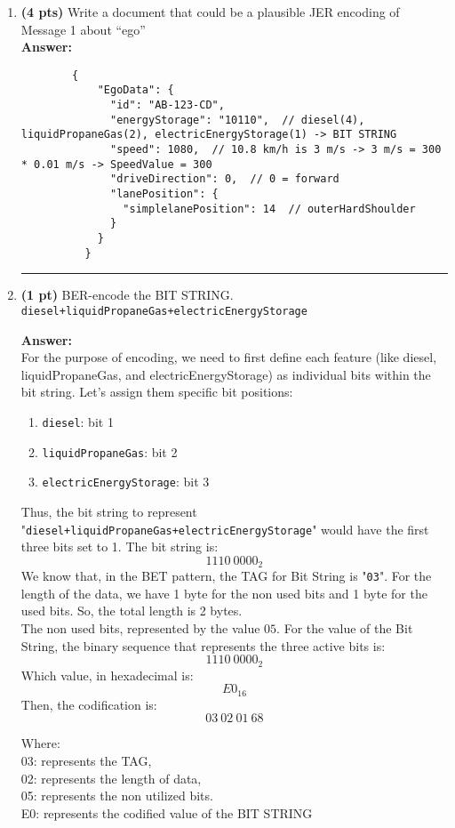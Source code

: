 \documentclass[a4paper,10pt]{article}
\begin{document}
\begin{enumerate}[label=\textbf{Question \arabic*.}]
    \break
    \item \textbf{(4 pts)} Write a document that could be a plausible JER encoding of Message 1 about “ego” \\
    
    \textbf{Answer:} 
    \begin{lstlisting}
        {
            "EgoData": {
              "id": "AB-123-CD",
              "energyStorage": "10110",  // diesel(4), liquidPropaneGas(2), electricEnergyStorage(1) -> BIT STRING
              "speed": 1080,  // 10.8 km/h is 3 m/s -> 3 m/s = 300 * 0.01 m/s -> SpeedValue = 300
              "driveDirection": 0,  // 0 = forward
              "lanePosition": {
                "simplelanePosition": 14  // outerHardShoulder
              }
            }
          }
        \end{lstlisting}
        \noindent\rule{\textwidth}{0.4mm}
    
    \item \textbf{(1 pt)} BER-encode the BIT STRING. \texttt{diesel+liquidPropaneGas+electricEnergyStorage}
    
    \textbf{Answer:} \\
    For the purpose of encoding, we need to first define each feature (like diesel, liquidPropaneGas, and electricEnergyStorage) as individual bits within the bit string. Let’s assign them specific bit positions:

    \begin{enumerate}
        \item \texttt{diesel}: bit 1
        \item \texttt{liquidPropaneGas}: bit 2
        \item \texttt{electricEnergyStorage}: bit 3
    \end{enumerate}
    Thus, the bit string to represent "\texttt{diesel+liquidPropaneGas+electricEnergyStorage}" would have the first three bits set to 1. The bit string is: 
    \[1110\ 0000_2\]
    We know that, in the BET pattern, the TAG for Bit String is "\texttt{03}".
    For the length of the data, we have 1 byte for the non used bits and 1 byte for the used bits. So, the total length is 2 bytes.\\
    The non used bits, represented by the value $05$.
    For the value of the Bit String, the binary sequence that represents the three active bits is:
    \[1110\ 0000_2\]
    Which value, in hexadecimal is:
    \[E0_{16}\]
    Then, the codification is:
    \[03\ 02\ 01\ 68\]
    \parbox{\textwidth}{
        \small
        Where: \\
        03: represents the TAG, \\
        02: represents the length of data, \\
        05: represents the non utilized bits. \\
        E0: represents the codified value of the BIT STRING
    } \\


\end{enumerate}
\end{document}
